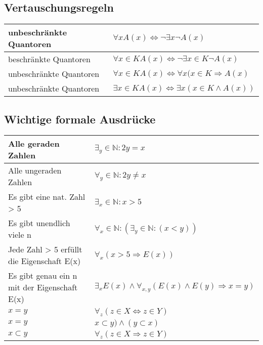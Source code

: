 \subsection{Vertauschungsregeln}
\begin{longtable}{|p{}|p{}|}
	\hline
	unbeschränkte Quantoren & \( \forall x A(x) \Leftrightarrow \neg \exists x \neg A(x) \)\\
	\hline
	beschränkte Quantoren & \( \forall x \in K A(x) \Leftrightarrow \neg \exists x \in K \neg A(x) \)\\
	\hline
	unbeschränkte Quantoren & \( \forall x \in K A(x) \Leftrightarrow \forall x (x \in K \Rightarrow A(x) \)\\
	\hline
	unbeschränkte Quantoren & \( \exists x \in K A(x) \Leftrightarrow \exists x (x \in K \wedge A(x)) \)\\
	\hline
\end{longtable}
\subsection{Wichtige formale Ausdrücke}
\begin{longtable}{p{}|p{}}
	Alle geraden Zahlen & \( \exists_y \in \mathbb{N}: 2y = x \)\\
	\hline
	Alle ungeraden Zahlen & \( \forall_y \in \mathbb{N}: 2y \neq x \)\\
	\hline
	Es gibt eine nat. Zahl > 5 & \(\exists_x \in \mathbb{N}: x > 5 \)\\
	\hline
	Es gibt unendlich viele n & \(\forall_x \in \mathbb{N}: (\exists_y \in \mathbb{N}: (x < y)) \)\\
	\hline
	Jede Zahl > 5 erfüllt die Eigenschaft E(x) & \(\forall_x (x > 5 \Rightarrow E(x)) \)\\
	\hline
	Es gibt genau ein n mit der Eigenschaft E(x) & \(\exists_x E(x) \wedge \forall_{x,y} (E(x) \wedge E(y) \Rightarrow x= y)\) \\
	\hline
	\(x = y\) & \(\forall_z(z \in X \Leftrightarrow z \in Y) \) \\
	\(x = y\) & \(x \subset y) \wedge (y \subset x)\) \\
	\hline
	\(x \subset y\) & \(\forall_z(z \in X \Rightarrow z \in Y) \) \\
\end{longtable}
